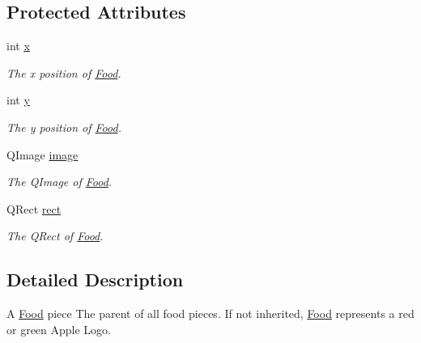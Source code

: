 \subsection*{\-Protected \-Attributes}
\begin{DoxyCompactItemize}
\item 
\hypertarget{classFood_a6cb4da80ded62e777162ed689afff2ec}{int \hyperlink{classFood_a6cb4da80ded62e777162ed689afff2ec}{x}}\label{classFood_a6cb4da80ded62e777162ed689afff2ec}

\begin{DoxyCompactList}\small\item\em \-The x position of \hyperlink{classFood}{\-Food}. \end{DoxyCompactList}\item 
\hypertarget{classFood_aad0125787e9b00210d2a0b0dc94b39c4}{int \hyperlink{classFood_aad0125787e9b00210d2a0b0dc94b39c4}{y}}\label{classFood_aad0125787e9b00210d2a0b0dc94b39c4}

\begin{DoxyCompactList}\small\item\em \-The y position of \hyperlink{classFood}{\-Food}. \end{DoxyCompactList}\item 
\hypertarget{classFood_a53968c7ffd02f4a65201438857efe9bf}{\-Q\-Image \hyperlink{classFood_a53968c7ffd02f4a65201438857efe9bf}{image}}\label{classFood_a53968c7ffd02f4a65201438857efe9bf}

\begin{DoxyCompactList}\small\item\em \-The \-Q\-Image of \hyperlink{classFood}{\-Food}. \end{DoxyCompactList}\item 
\hypertarget{classFood_a1cb41fead62d37b800db81ed9e1f3939}{\-Q\-Rect \hyperlink{classFood_a1cb41fead62d37b800db81ed9e1f3939}{rect}}\label{classFood_a1cb41fead62d37b800db81ed9e1f3939}

\begin{DoxyCompactList}\small\item\em \-The \-Q\-Rect of \hyperlink{classFood}{\-Food}. \end{DoxyCompactList}\end{DoxyCompactItemize}


\subsection{\-Detailed \-Description}
\-A \hyperlink{classFood}{\-Food} piece \-The parent of all food pieces. \-If not inherited, \hyperlink{classFood}{\-Food} represents a red or green \-Apple \-Logo. 

